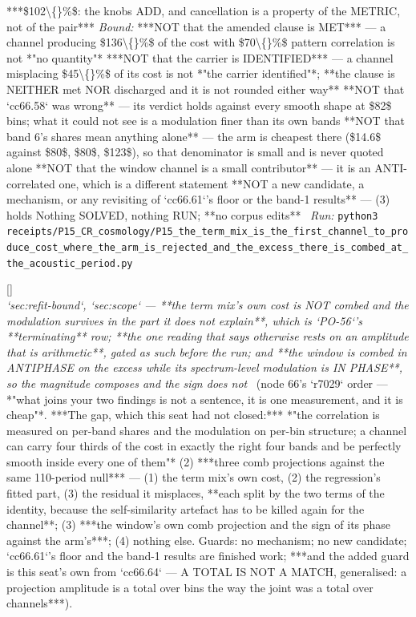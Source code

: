 \begin{description}
***\$102\textbackslash\{\}\%\$: the knobs ADD, and cancellation is a property of the METRIC, not of the pair***
 \emph{Bound:}  ***NOT that the amended clause is MET*** --- a channel producing \$136\textbackslash\{\}\%\$ of the cost with \$70\textbackslash\{\}\%\$ pattern correlation is not *"no quantity"*  ***NOT that the carrier is IDENTIFIED*** --- a channel misplacing \$45\textbackslash\{\}\%\$ of its cost is not *"the carrier identified"*; **the clause is NEITHER met NOR discharged and it is not rounded either way**  **NOT that `cc66.58` was wrong** --- its verdict holds against every smooth shape at \$82\$ bins; what it could not see is a modulation finer than its own bands  **NOT that band 6's shares mean anything alone** --- the arm is cheapest there (\$14.6\$ against \$80\$, \$80\$, \$123\$), so that denominator is small and is never quoted alone  **NOT that the window channel is a small contributor** --- it is an ANTI-correlated one, which is a different statement  **NOT a new candidate, a mechanism, or any revisiting of `cc66.61`'s floor or the band-1 results** --- (3) holds  Nothing SOLVED, nothing RUN; **no corpus edits**
\ \emph{Run:} \texttt{python3 receipts/P15\_CR\_cosmology/P15\_the\_term\_mix\_is\_the\_first\_channel\_to\_produce\_cost\_where\_the\_arm\_is\_rejected\_and\_the\_excess\_there\_is\_combed\_at\_the\_acoustic\_period.py}
\item[\rcptlabel{P15_the_term_mix_does_not_carry_the_modulation_and_it_survives_in_the_part_no_channel_explains}{P15R212}\textbf{P15R212}\quad\texttt{P15\_the\_term\_mix\_does\_not\_carry\_the\_modulation\_and\_it\_survives\_in\_the\_part\_no\_channel\_explains}]\hfill\textsf{[]}\\
\textit{`sec:refit-bound`, `sec:scope` --- **the term mix's own cost is NOT combed and the modulation survives in the part it does not explain**, which is `PO-56`'s **terminating** row; **the one reading that says otherwise rests on an amplitude that is arithmetic**, gated as such before the run; and **the window is combed in ANTIPHASE on the excess while its spectrum-level modulation is IN PHASE**, so the magnitude composes and the sign does not} \ (node 66's `r7029` order --- *"what joins your two findings is not a sentence, it is one measurement, and it is cheap"*.  ***The gap, which this seat had not closed:*** *"the correlation is measured on per-band shares and the modulation on per-bin structure; a channel can carry four thirds of the cost in exactly the right four bands and be perfectly smooth inside every one of them"*  (2) ***three comb projections against the same 110-period null*** --- (1) the term mix's own cost, (2) the regression's fitted part, (3) the residual it misplaces, **each split by the two terms of the identity, because the self-similarity artefact has to be killed again for the channel**; (3) ***the window's own comb projection and the sign of its phase against the arm's***; (4) nothing else.  Guards: no mechanism; no new candidate; `cc66.61`'s floor and the band-1 results are finished work; ***and the added guard is this seat's own from `cc66.64` --- A TOTAL IS NOT A MATCH, generalised: a projection amplitude is a total over bins the way the joint was a total over channels***). 

\end{description}
